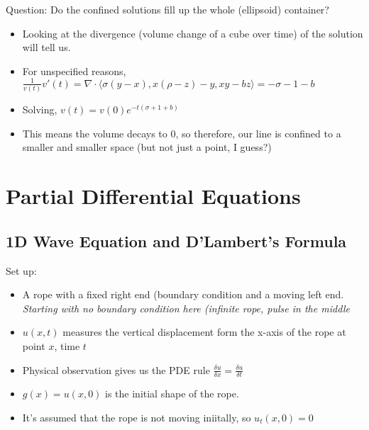 \documentclass[11pt, oneside]{article}   	%
\begin{document}
Question: Do the confined solutions fill up the whole (ellipsoid) container?  
\begin{itemize}
\item Looking at the divergence (volume change of a cube over time) of the solution will tell us.
\item For unspecified reasons, $\frac{1}{v(t)}v'(t) = \nabla \cdot \langle \sigma(y-x), x(\rho - z) - y, xy-bz \rangle = -\sigma -1 - b$
\item Solving, $v(t) = v(0)e^{-t(\sigma + 1 + b)}$
\item This means the volume decays to 0, so therefore, our line is confined to a smaller and smaller space (but not just a point, I guess?)
\end{itemize}

\section{Partial Differential Equations}
\subsection{1D  Wave Equation and D'Lambert's Formula}

Set up:


\begin{itemize}
\item A rope with a fixed right end  (boundary condition and a moving left end.  \emph{Starting with no boundary condition here (infinite rope, pulse in the middle}
\item $u(x,t)$ measures the vertical displacement form the x-axis of the rope at point $x$, time $t$
\item Physical observation gives us the PDE rule $\frac{\delta u}{\delta x} = \frac{\delta u}{\delta t}$
\item $g(x) = u(x, 0)$ is the initial shape of the rope.
\item It's assumed that the rope is not moving iniitally, so $u_t(x,0) = 0$
\end{itemize}
\end{document}
